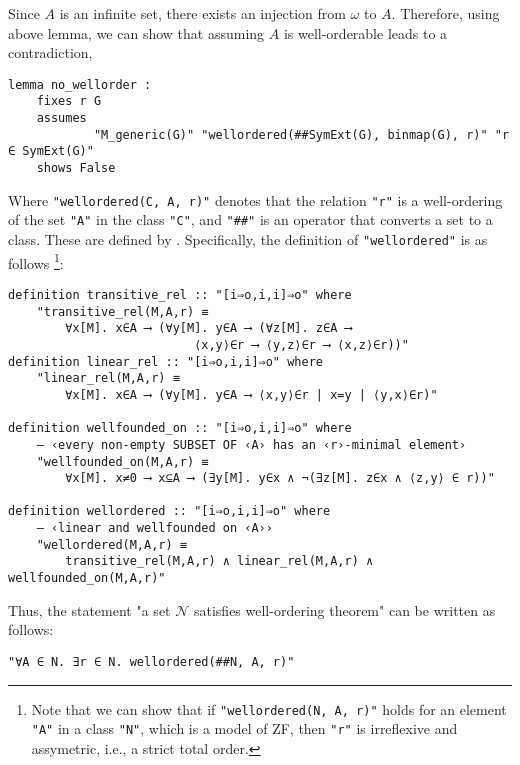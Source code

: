\documentclass{report}
\newenvironment{isaframe}{\begin{mdframed}[topline=false, rightline=false, bottomline=false]}{\end{mdframed}}
\begin{document}
Since $A$ is an infinite set, there exists an injection from $\omega$ to $A$.
Therefore, using above lemma, we can show that assuming $A$ is well-orderable leads to a contradiction,

\begin{isaframe}
\begin{verbatim}
lemma no_wellorder : 
    fixes r G
    assumes 
            "M_generic(G)" "wellordered(##SymExt(G), binmap(G), r)" "r ∈ SymExt(G)" 
    shows False
\end{verbatim}
\end{isaframe}

Where \texttt{"wellordered(C, A, r)"} denotes that 
the relation \texttt{"r"} is a well-ordering of the set \texttt{"A"} in the class \texttt{"C"}, 
and \texttt{"\#\#"} is an operator that converts a set to a class.
These are defined by \cite{paulson_AC_consistency}.
Specifically, the definition of \texttt{"wellordered"} is as follows
\footnote{
Note that we can show that 
if \texttt{"wellordered(N, A, r)"} holds for an element \texttt{"A"} in a class \texttt{"N"}, which is a model of ZF,
then \texttt{"r"} is irreflexive and assymetric, i.e., a strict total order.
}:
\begin{isaframe}
\begin{verbatim}
definition transitive_rel :: "[i⇒o,i,i]⇒o" where
    "transitive_rel(M,A,r) ≡ 
        ∀x[M]. x∈A ⟶ (∀y[M]. y∈A ⟶ (∀z[M]. z∈A ⟶ 
                          ⟨x,y⟩∈r ⟶ ⟨y,z⟩∈r ⟶ ⟨x,z⟩∈r))"
definition linear_rel :: "[i⇒o,i,i]⇒o" where
    "linear_rel(M,A,r) ≡ 
        ∀x[M]. x∈A ⟶ (∀y[M]. y∈A ⟶ ⟨x,y⟩∈r | x=y | ⟨y,x⟩∈r)"

definition wellfounded_on :: "[i⇒o,i,i]⇒o" where
    ― ‹every non-empty SUBSET OF ‹A› has an ‹r›-minimal element›
    "wellfounded_on(M,A,r) ≡ 
        ∀x[M]. x≠0 ⟶ x⊆A ⟶ (∃y[M]. y∈x ∧ ¬(∃z[M]. z∈x ∧ ⟨z,y⟩ ∈ r))"
        
definition wellordered :: "[i⇒o,i,i]⇒o" where
    ― ‹linear and wellfounded on ‹A››
    "wellordered(M,A,r) ≡ 
        transitive_rel(M,A,r) ∧ linear_rel(M,A,r) ∧ wellfounded_on(M,A,r)"
\end{verbatim}
\end{isaframe}

Thus, the statement "a set $\mathcal{N}$ satisfies well-ordering theorem" can be written as follows:
\begin{isaframe}
\begin{verbatim}
"∀A ∈ N. ∃r ∈ N. wellordered(##N, A, r)"
\end{verbatim}
\end{isaframe}
\end{document}
